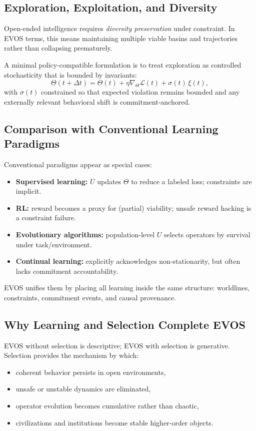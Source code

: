 \documentclass[11pt]{article}
\begin{document}
\subsection{Exploration, Exploitation, and Diversity}
\label{sec:exploration}

Open-ended intelligence requires \emph{diversity preservation} under constraint. In EVOS terms,
this means maintaining multiple viable basins and trajectories rather than collapsing prematurely.

A minimal policy-compatible formulation is to treat exploration as controlled stochasticity that is
bounded by invariants:
\[
\Theta(t+\Delta t) = \Theta(t) + \eta \nabla_\Theta \mathcal{L}(t) + \sigma(t)\,\xi(t),
\]
with $\sigma(t)$ constrained so that expected violation remains bounded and any externally relevant
behavioral shift is commitment-anchored.

\subsection{Comparison with Conventional Learning Paradigms}
\label{sec:comparison-learning}

Conventional paradigms appear as special cases:

\begin{itemize}
  \item \textbf{Supervised learning:} $U$ updates $\Theta$ to reduce a labeled loss; constraints are implicit.
  \item \textbf{RL:} reward becomes a proxy for (partial) viability; unsafe reward hacking is a constraint failure.
  \item \textbf{Evolutionary algorithms:} population-level $U$ selects operators by survival under task/environment.
  \item \textbf{Continual learning:} explicitly acknowledges non-stationarity, but often lacks commitment accountability.
\end{itemize}

EVOS unifies them by placing all learning inside the same structure: worldlines, constraints,
commitment events, and causal provenance.

\subsection{Why Learning and Selection Complete EVOS}
\label{sec:why-selection-completes}

EVOS without selection is descriptive; EVOS with selection is generative. Selection provides the
mechanism by which:
\begin{itemize}
  \item coherent behavior persists in open environments,
  \item unsafe or unstable dynamics are eliminated,
  \item operator evolution becomes cumulative rather than chaotic,
  \item civilizations and institutions become stable higher-order objects.
\end{itemize}
\end{document}
